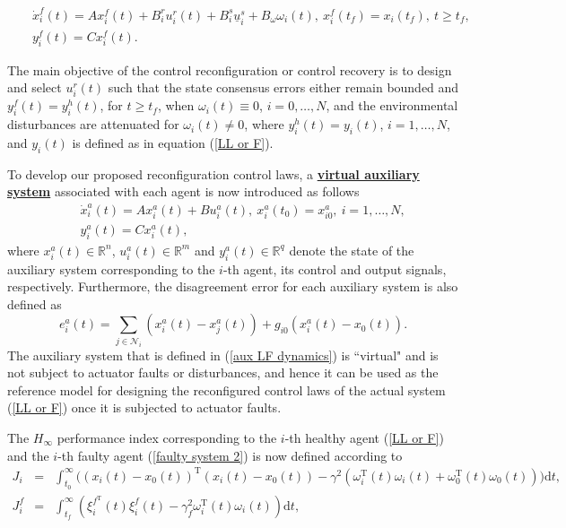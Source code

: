 \documentclass[12pt,draftcls,onecolumn]{IEEEtran}
\begin{document}
\begin{eqnarray}
&&\dot x_i^f(t)=A x_i^f(t)+B_i^r u_i^r(t)+ B_i^s \underline u_i^{s}+ B_{\omega}\omega_i(t),\ x_i^f(t_f)=x_i(t_f), \  t\geq t_f, \label{faulty system 2}\\ 
&&y_i^f(t)=Cx_i^f(t).\nonumber
\end{eqnarray} \par
The main objective of the control reconfiguration or control recovery is to design and select   $u_i^r(t)$  such that the state consensus errors either remain bounded and $y_i^f(t)=y_i^h(t)$,  for $t\geq t_f$, when $\omega_i(t)\equiv 0$, $i=0,\dots,N$, and the environmental disturbances are  attenuated for $\omega_i(t)\ne 0$, where $y_i^h(t)=y_i(t)$, $i=1,\dots,N$, and $y_i(t)$ is defined as in equation (\ref{LL or F}).\par 
 To develop our proposed reconfiguration control laws, a \textbf{\underline{virtual auxiliary system}} associated with each agent is now introduced as follows
 \begin{eqnarray}
 &&\dot x_i^a(t)=A x_i^a(t)+B u_i^a(t), \ x_i^a(t_0)=x_{i0}^a, \ i=1,\dots,N,\label{aux LF dynamics}\\
 &&y_i^a(t)=Cx_i^a(t),\nonumber
 \end{eqnarray}
where $x_i^a(t)\in\mathbb{R}^n$, $u_i^a(t)\in\mathbb{R}^m$ and $y_i^a(t)\in\mathbb{R}^q$ denote the state of the auxiliary system corresponding to the $i$-th agent,  its control and output signals, respectively.  
Furthermore, the disagreement error for each auxiliary system is also defined as
 \begin{equation}
 e_i^a(t)=\sum_{j\in\mathcal{N}_i}(x_i^a(t)-x_j^a(t))+g_{i0}(x_i^a(t)-x_0(t)).\label{auxiliary consensus}
 \end{equation}
 The auxiliary system that is defined in (\ref{aux LF dynamics}) is ``virtual" and is not subject to actuator faults or disturbances, and hence it can be used as the {reference model} for designing the reconfigured  control laws of the actual  system (\ref{LL or F}) once it is subjected to actuator faults.\par 
 The  $H_{\infty}$ performance index corresponding to the $i$-th healthy agent (\ref{LL or F}) and the $i$-th faulty agent (\ref{faulty system 2}) is now defined according to 
 \begin{eqnarray}
 J_i&=&\int_{t_0}^{\infty}\big((x_i(t)-x_0(t))^{\text{T}}(x_i(t)-x_0(t))-\gamma^2(\omega_i^{\text{T}}(t)\omega_i(t)+\omega_0^{\text{T}}(t)\omega_0(t))\big)\text{d}t,\label{agent cost index}\\
 J_i^f&=&\int_{t_f}^{\infty}(\xi_i^{f^\text{T}}(t)\xi_i^f(t)-\gamma_f^2\omega_i^{\text{T}}(t)\omega_i(t))\text{d}t,\label{auxiliary cost index}
 \end{eqnarray}
\end{document}
